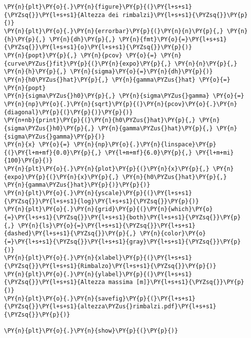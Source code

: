 \begin{Verbatim}[label=\makebox{\href{https://github.com/unipi-physics-labs/lab1-sheets/tree/main/snippy/dad_palla.py}{https://github.com/.../dad\_palla.py}},commandchars=\\\{\}]
\PY{n}{plt}\PY{o}{.}\PY{n}{figure}\PY{p}{(}\PY{l+s+s1}{\PYZsq{}}\PY{l+s+s1}{Altezza dei rimbalzi}\PY{l+s+s1}{\PYZsq{}}\PY{p}{)}
\PY{n}{plt}\PY{o}{.}\PY{n}{errorbar}\PY{p}{(}\PY{n}{n}\PY{p}{,} \PY{n}{h}\PY{p}{,} \PY{n}{dh}\PY{p}{,} \PY{n}{fmt}\PY{o}{=}\PY{l+s+s1}{\PYZsq{}}\PY{l+s+s1}{o}\PY{l+s+s1}{\PYZsq{}}\PY{p}{)}
\PY{n}{popt}\PY{p}{,} \PY{n}{pcov} \PY{o}{=} \PY{n}{curve\PYZus{}fit}\PY{p}{(}\PY{n}{expo}\PY{p}{,} \PY{n}{n}\PY{p}{,} \PY{n}{h}\PY{p}{,} \PY{n}{sigma}\PY{o}{=}\PY{n}{dh}\PY{p}{)}
\PY{n}{h0\PYZus{}hat}\PY{p}{,} \PY{n}{gamma\PYZus{}hat} \PY{o}{=} \PY{n}{popt}
\PY{n}{sigma\PYZus{}h0}\PY{p}{,} \PY{n}{sigma\PYZus{}gamma} \PY{o}{=} \PY{n}{np}\PY{o}{.}\PY{n}{sqrt}\PY{p}{(}\PY{n}{pcov}\PY{o}{.}\PY{n}{diagonal}\PY{p}{(}\PY{p}{)}\PY{p}{)}
\PY{n+nb}{print}\PY{p}{(}\PY{n}{h0\PYZus{}hat}\PY{p}{,} \PY{n}{sigma\PYZus{}h0}\PY{p}{,} \PY{n}{gamma\PYZus{}hat}\PY{p}{,} \PY{n}{sigma\PYZus{}gamma}\PY{p}{)}
\PY{n}{x} \PY{o}{=} \PY{n}{np}\PY{o}{.}\PY{n}{linspace}\PY{p}{(}\PY{l+m+mf}{0.0}\PY{p}{,} \PY{l+m+mf}{6.0}\PY{p}{,} \PY{l+m+mi}{100}\PY{p}{)}
\PY{n}{plt}\PY{o}{.}\PY{n}{plot}\PY{p}{(}\PY{n}{x}\PY{p}{,} \PY{n}{expo}\PY{p}{(}\PY{n}{x}\PY{p}{,} \PY{n}{h0\PYZus{}hat}\PY{p}{,} \PY{n}{gamma\PYZus{}hat}\PY{p}{)}\PY{p}{)}
\PY{n}{plt}\PY{o}{.}\PY{n}{yscale}\PY{p}{(}\PY{l+s+s1}{\PYZsq{}}\PY{l+s+s1}{log}\PY{l+s+s1}{\PYZsq{}}\PY{p}{)}
\PY{n}{plt}\PY{o}{.}\PY{n}{grid}\PY{p}{(}\PY{n}{which}\PY{o}{=}\PY{l+s+s1}{\PYZsq{}}\PY{l+s+s1}{both}\PY{l+s+s1}{\PYZsq{}}\PY{p}{,} \PY{n}{ls}\PY{o}{=}\PY{l+s+s1}{\PYZsq{}}\PY{l+s+s1}{dashed}\PY{l+s+s1}{\PYZsq{}}\PY{p}{,} \PY{n}{color}\PY{o}{=}\PY{l+s+s1}{\PYZsq{}}\PY{l+s+s1}{gray}\PY{l+s+s1}{\PYZsq{}}\PY{p}{)}
\PY{n}{plt}\PY{o}{.}\PY{n}{xlabel}\PY{p}{(}\PY{l+s+s1}{\PYZsq{}}\PY{l+s+s1}{Rimbalzo}\PY{l+s+s1}{\PYZsq{}}\PY{p}{)}
\PY{n}{plt}\PY{o}{.}\PY{n}{ylabel}\PY{p}{(}\PY{l+s+s1}{\PYZsq{}}\PY{l+s+s1}{Altezza massima [m]}\PY{l+s+s1}{\PYZsq{}}\PY{p}{)}
\PY{n}{plt}\PY{o}{.}\PY{n}{savefig}\PY{p}{(}\PY{l+s+s1}{\PYZsq{}}\PY{l+s+s1}{altezza\PYZus{}rimbalzi.pdf}\PY{l+s+s1}{\PYZsq{}}\PY{p}{)}

\PY{n}{plt}\PY{o}{.}\PY{n}{show}\PY{p}{(}\PY{p}{)}
\end{Verbatim}
